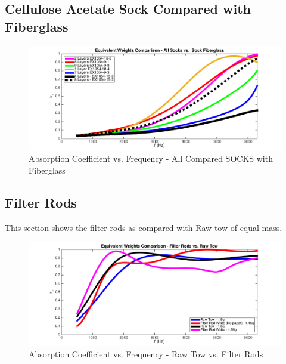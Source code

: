 \subsection{Cellulose Acetate Sock Compared with Fiberglass}
\begin{figure}[hbtp]
    \centering
    \includegraphics[width=1\textwidth]{Chapter-4/figs/AfigSOCKScomparefiberglass}
    \caption{Absorption Coefficient vs. Frequency - All Compared SOCKS with Fiberglass}
    \label{fig:AfigSOCKScomparefiberglass}
\end{figure}
\clearpage

\subsection{Filter Rods}
This section shows the filter rods as compared with Raw tow of equal mass.
\begin{figure}[hbtp]
    \centering
    \includegraphics[width=1\textwidth]{Chapter-4/figs/Afigfilterrodscomparerawtow}
    \caption{Absorption Coefficient vs. Frequency - Raw Tow vs. Filter Rods}
    \label{fig:Afigfilterrodscomparerawtow}
\end{figure}

